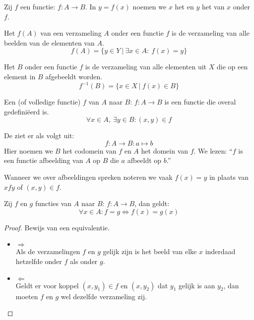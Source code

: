\documentclass[main.tex]{subfiles}
\begin{document}
\begin{de}
  Zij $f$ een functie: $f: A \rightarrow B$. 
  In $y = f(x)$ noemen we $x$ het  en $y$ het  van $x$ onder $f$.
\end{de}

\begin{de}
  Het  $f(A)$ van een verzameling $A$ onder een functie $f$ is de verzameling van alle beelden van de elementen van $A$.
  \[ f(A) = \{ y \in Y \ |\ \exists x \in A:\ f(x) = y \} \]
\end{de}

\begin{de}
  Het  $B$ onder een functie $f$ is de verzameling van alle elementen uit $X$ die op een element in $B$ afgebeeldt worden.
  \[ f^{-1}(B) = \{ x \in X \ |\ f(x) \in B \} \]
\end{de}

\begin{de}
  Een  (of volledige functie) $f$ van $A$ naar $B$: $f: A \rightarrow B$ is een functie die overal gedefini\"eerd is.
  \[ \forall x \in A,\ \exists y \in B: (x,y) \in f \]
\end{de} 
 
\begin{de}
  De  ziet er als volgt uit:
  \[ f: A \rightarrow B: a \mapsto b \]
  Hier noemen we $B$ het codomein van $f$ en $A$ het domein van $f$.
  We lezen: ``$f$ is een functie afbeelding van $A$ op $B$ die $a$ afbeeldt op $b$.''
\end{de} 
 
\begin{de}
  Wanneer we over afbeeldingen spreken noteren we vaak $f(x) = y$ in plaats van $x f y$ of $(x,y) \in f$.
\end{de}


\begin{st}
  Zij $f$ en $g$ functies van $A$ naar $B$: $f: A \rightarrow B$, dan geldt:
  \[ \forall x \in A: f = g \Leftrightarrow f(x) = g(x) \]  
  \begin{proof}
    Bewijs van een equivalentie.
    \begin{itemize}
    \item $\Rightarrow$\\
      Als de verzamelingen $f$ en $g$ gelijk zijn is het beeld van elke $x$ inderdaad hetzelfde onder $f$ als onder $g$.
    \item $\Leftarrow$\\
      Geldt er voor koppel $(x,y_{1}) \in f$ en $(x,y_{2})$ dat $y_{1}$ gelijk is aan $y_{2}$, dan moeten $f$ en $g$ wel dezelfde verzameling zij.
    \end{itemize}
  \end{proof}
\end{st}
\end{document}
